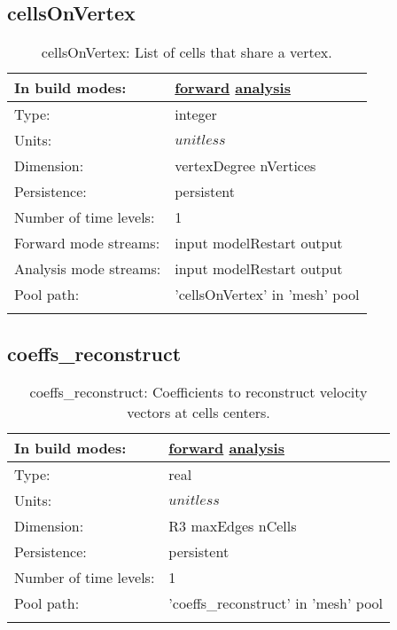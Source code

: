 \subsection[cellsOnVertex]{cellsOnVertex}
\label{subsec:var_sec_mesh_cellsOnVertex}
\begin{center}
\begin{longtable}{| p{2.0in} | p{4.0in} |}
        \hline 
        In build modes: & \hyperref[subsec:forward_var_tab_mesh]{forward} \hyperref[subsec:analysis_var_tab_mesh]{analysis} \\
        \hline 
        Type: & integer \\
        \hline 
        Units: & $unitless$ \\
        \hline 
        Dimension: & vertexDegree nVertices \\
        \hline 
        Persistence: & persistent \\
        \hline 
        Number of time levels: & 1 \\
        \hline 
		 Forward mode streams: &  input modelRestart output \\
        \hline 
		 Analysis mode streams: &  input modelRestart output \\
        \hline 
            Pool path: & 'cellsOnVertex' in 'mesh' pool
 \\
		 \hline 
    \caption{cellsOnVertex: List of cells that share a vertex.}
\end{longtable}
\end{center}
\subsection[coeffs\_reconstruct]{coeffs\_reconstruct}
\label{subsec:var_sec_mesh_coeffs_reconstruct}
\begin{center}
\begin{longtable}{| p{2.0in} | p{4.0in} |}
        \hline 
        In build modes: & \hyperref[subsec:forward_var_tab_mesh]{forward} \hyperref[subsec:analysis_var_tab_mesh]{analysis} \\
        \hline 
        Type: & real \\
        \hline 
        Units: & $unitless$ \\
        \hline 
        Dimension: & R3 maxEdges nCells \\
        \hline 
        Persistence: & persistent \\
        \hline 
        Number of time levels: & 1 \\
        \hline 
            Pool path: & 'coeffs\_reconstruct' in 'mesh' pool
 \\
		 \hline 
    \caption{coeffs\_reconstruct: Coefficients to reconstruct velocity vectors at cells centers.}
\end{longtable}
\end{center}
